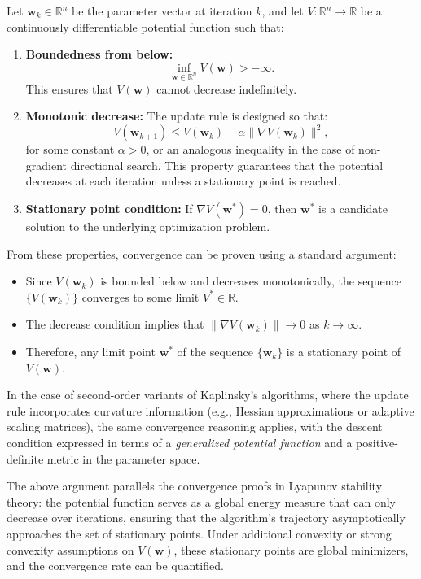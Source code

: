\documentclass[12pt]{article}
\begin{document}
Let $\mathbf{w}_k \in \mathbb{R}^n$ be the parameter vector at iteration $k$, and let $V: \mathbb{R}^n \to \mathbb{R}$ be a continuously differentiable potential function such that:
\begin{enumerate}
    \item \textbf{Boundedness from below:}
    \[
    \inf_{\mathbf{w} \in \mathbb{R}^n} V(\mathbf{w}) > -\infty.
    \]
    This ensures that $V(\mathbf{w})$ cannot decrease indefinitely.
    \item \textbf{Monotonic decrease:} The update rule is designed so that:
    \[
    V(\mathbf{w}_{k+1}) \le V(\mathbf{w}_k) - \alpha \|\nabla V(\mathbf{w}_k)\|^2,
    \]
    for some constant $\alpha > 0$, or an analogous inequality in the case of non-gradient directional search. This property guarantees that the potential decreases at each iteration unless a stationary point is reached.
    \item \textbf{Stationary point condition:} If $\nabla V(\mathbf{w}^*) = 0$, then $\mathbf{w}^*$ is a candidate solution to the underlying optimization problem.
\end{enumerate}

From these properties, convergence can be proven using a standard argument:
\begin{itemize}
    \item Since $V(\mathbf{w}_k)$ is bounded below and decreases monotonically, the sequence $\{V(\mathbf{w}_k)\}$ converges to some limit $V^* \in \mathbb{R}$.
    \item The decrease condition implies that $\|\nabla V(\mathbf{w}_k)\| \to 0$ as $k \to \infty$.
    \item Therefore, any limit point $\mathbf{w}^*$ of the sequence $\{\mathbf{w}_k\}$ is a stationary point of $V(\mathbf{w})$.
\end{itemize}

In the case of second-order variants of Kaplinsky's algorithms, where the update rule incorporates curvature information (e.g., Hessian approximations or adaptive scaling matrices), the same convergence reasoning applies, with the descent condition expressed in terms of a \emph{generalized potential function} and a positive-definite metric in the parameter space.

The above argument parallels the convergence proofs in Lyapunov stability theory: the potential function serves as a global energy measure that can only decrease over iterations, ensuring that the algorithm's trajectory asymptotically approaches the set of stationary points. Under additional convexity or strong convexity assumptions on $V(\mathbf{w})$, these stationary points are global minimizers, and the convergence rate can be quantified.
 
\end{document}
